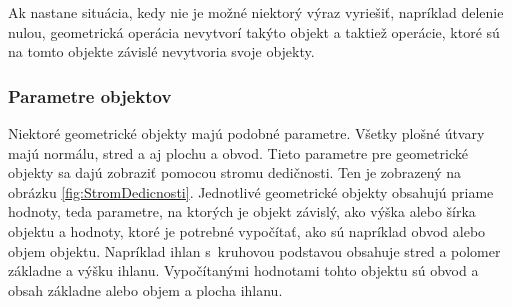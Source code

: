 Ak nastane situácia, kedy nie je možné niektorý výraz vyriešiť, napríklad delenie nulou, geometrická operácia nevytvorí takýto objekt a taktiež operácie, ktoré sú na tomto objekte závislé nevytvoria svoje objekty.

\subsubsection*{Parametre objektov}





Niektoré geometrické objekty majú podobné parametre. Všetky plošné útvary majú normálu, stred a aj plochu a obvod. 
Tieto parametre pre geometrické objekty sa dajú zobraziť pomocou stromu dedičnosti. Ten je zobrazený na obrázku \ref{fig:StromDedicnosti}.  Jednotlivé geometrické objekty obsahujú priame hodnoty, teda parametre, na ktorých je objekt závislý, ako výška alebo šírka objektu a hodnoty, ktoré je potrebné vypočítať, ako sú napríklad obvod alebo objem objektu. Napríklad ihlan s~kruhovou podstavou obsahuje stred a polomer základne a výšku ihlanu. Vypočítanými hodnotami tohto objektu sú obvod a obsah základne alebo objem a plocha ihlanu.  

